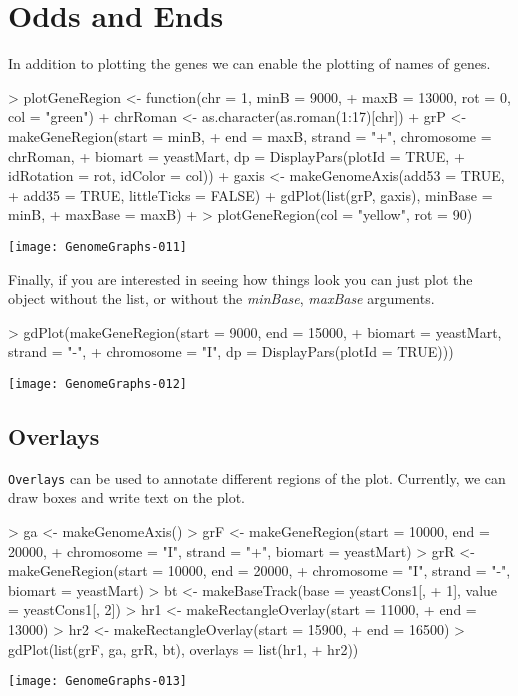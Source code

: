 \documentclass[11pt]{article}
\begin{document}
\section{Odds and Ends}
In addition to plotting the genes we can enable the plotting of names of genes. 

\begin{Schunk}
\begin{Sinput}
> plotGeneRegion <- function(chr = 1, minB = 9000, 
+     maxB = 13000, rot = 0, col = "green") {
+     chrRoman <- as.character(as.roman(1:17)[chr])
+     grP <- makeGeneRegion(start = minB, 
+         end = maxB, strand = "+", chromosome = chrRoman, 
+         biomart = yeastMart, dp = DisplayPars(plotId = TRUE, 
+             idRotation = rot, idColor = col))
+     gaxis <- makeGenomeAxis(add53 = TRUE, 
+         add35 = TRUE, littleTicks = FALSE)
+     gdPlot(list(grP, gaxis), minBase = minB, 
+         maxBase = maxB)
+ }
> plotGeneRegion(col = "yellow", rot = 90)
\end{Sinput}
\end{Schunk}
\texttt{[image: GenomeGraphs-011]}

Finally, if you are interested in seeing how things look you can just
plot the object without the list, or without the \emph{minBase}, \emph{maxBase}
arguments. 
\begin{Schunk}
\begin{Sinput}
> gdPlot(makeGeneRegion(start = 9000, end = 15000, 
+     biomart = yeastMart, strand = "-", 
+     chromosome = "I", dp = DisplayPars(plotId = TRUE)))
\end{Sinput}
\end{Schunk}
\texttt{[image: GenomeGraphs-012]}

\subsection{Overlays} 
\texttt{Overlays} can be used to annotate different regions of the
plot. Currently, we can draw boxes and write text on the plot.

\begin{Schunk}
\begin{Sinput}
> ga <- makeGenomeAxis()
> grF <- makeGeneRegion(start = 10000, end = 20000, 
+     chromosome = "I", strand = "+", biomart = yeastMart)
> grR <- makeGeneRegion(start = 10000, end = 20000, 
+     chromosome = "I", strand = "-", biomart = yeastMart)
> bt <- makeBaseTrack(base = yeastCons1[, 
+     1], value = yeastCons1[, 2])
> hr1 <- makeRectangleOverlay(start = 11000, 
+     end = 13000)
> hr2 <- makeRectangleOverlay(start = 15900, 
+     end = 16500)
> gdPlot(list(grF, ga, grR, bt), overlays = list(hr1, 
+     hr2))
\end{Sinput}
\end{Schunk}
\texttt{[image: GenomeGraphs-013]}
\end{document}
